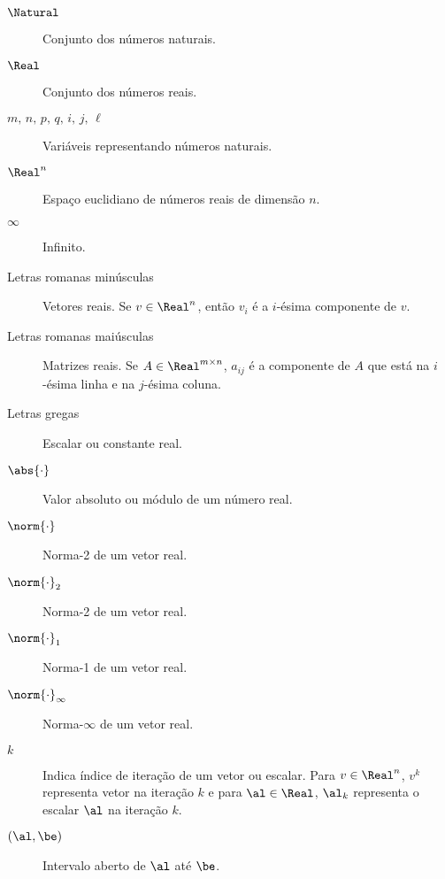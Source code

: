 
\begin{description}

	    \item[$\Natural$] Conjunto dos números naturais.

    \item[$\Real$] Conjunto dos números reais.

    \item[$m,\, n,\, p,\, q,\, i,\, j,\, \ell$] Variáveis representando números naturais.

    \item[$\Real^n$] Espaço euclidiano de  números reais de dimensão $n$.

    \item[$\infty$] Infinito.


     \item[Letras romanas minúsculas] Vetores reais. Se $v\in\Real^{n}$, então $v_{i}$ é a $i$-ésima componente de $v$.

    \item[Letras romanas maiúsculas] Matrizes reais. Se $A\in\Real^{m\times n}$, $a_{ij}$ é a componente de $A$ que está na $i$-ésima linha e na $j$-ésima coluna.

    \item[Letras gregas] Escalar ou constante real.


    \item[$\abs{\cdot}$] Valor absoluto ou módulo de um número  real. 
    \item[$\norm{\cdot}$] Norma-2 de um vetor real.

    \item[$\norm{\cdot}_{2}$] Norma-2 de um vetor real.

    \item[$\norm{\cdot}_{1}$] Norma-1 de um vetor real.

    \item[$\norm{\cdot}_{\infty}$] Norma-$\infty$ de um vetor real.

    \item[$k$] Indica índice de iteração de um vetor ou escalar.  Para $v\in\Real^{n}$, $v^{k}$ representa vetor na iteração $k$ e para $\al\in\Real$, $\al_{k}$ representa o escalar $\al$ na iteração $k$. 



    \item[$(\al, \be)$] Intervalo aberto de $\al$ até $\be$.


\end{description}
